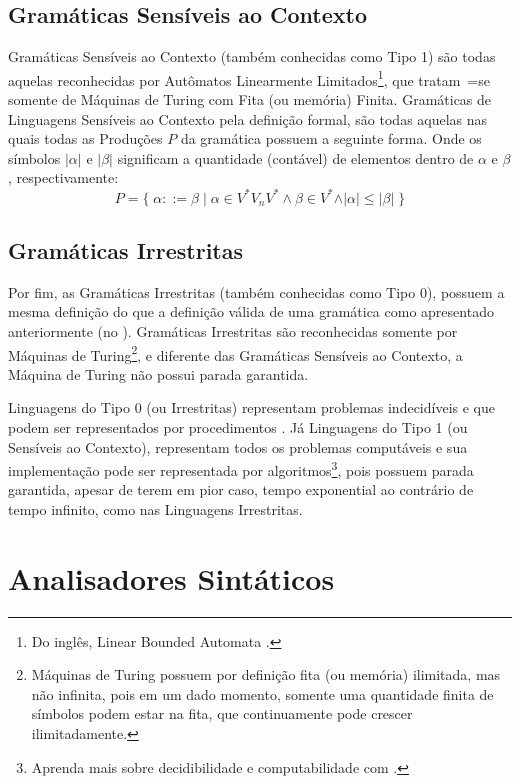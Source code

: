 \subsection{Gramáticas Sensíveis ao Contexto}

Gramáticas Sensíveis ao Contexto (também conhecidas como Tipo 1) são todas aquelas reconhecidas por Autômatos Linearmente Limitados\footnote{
Do inglês,
Linear Bounded Automata \cite{fundamentalsOfTheoreticalComputerScience}.
},
que tratam~=se somente de Máquinas de Turing \cite{sipserBook} com Fita (ou memória) Finita.
Gramáticas de Linguagens Sensíveis ao Contexto pela definição formal,
são todas aquelas nas quais todas as Produções $P$ da gramática possuem a seguinte forma.
Onde os símbolos $\vert\alpha\vert$ e
$\vert\beta\vert$ significam a quantidade (contável) de elementos dentro de $\alpha$ e
$\beta$,
respectivamente:
$$ P = \{\; \alpha ::= \beta \;|\; \alpha \in V^* V_n V^* \land \beta \in V^*
            \land \vert\alpha\vert \leq \vert\beta\vert \;\} $$


\subsection{Gramáticas Irrestritas}

Por fim,
as Gramáticas Irrestritas (também conhecidas como Tipo 0),
possuem a mesma definição do que a definição válida de uma gramática como apresentado anteriormente (no
).
Gramáticas Irrestritas são reconhecidas somente por Máquinas de Turing\footnote{
Máquinas de Turing possuem por definição fita (ou memória) ilimitada,
mas não infinita,
pois em um dado momento,
somente uma quantidade finita de símbolos podem estar na fita,
que continuamente pode crescer ilimitadamente.
},
e diferente das Gramáticas Sensíveis ao Contexto,
a Máquina de Turing não possui parada garantida.

Linguagens do Tipo 0 (ou Irrestritas) representam problemas indecidíveis e
que podem ser representados por procedimentos \cite{sipserBook}.
Já Linguagens do Tipo 1 (ou Sensíveis ao Contexto),
representam todos os problemas computáveis e
sua implementação pode ser representada por algoritmos\footnote{
Aprenda mais sobre decidibilidade e
computabilidade com .
},
pois possuem parada garantida,
apesar de terem em pior caso,
tempo exponential ao contrário de tempo infinito,
como nas Linguagens Irrestritas.


\section{Analisadores Sintáticos}
\label{analisadoresSintaticos}

